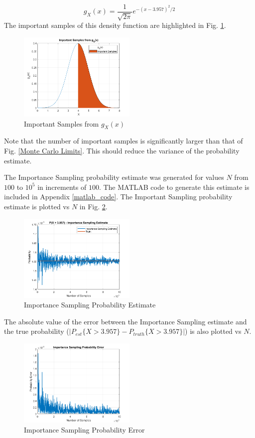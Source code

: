 \documentclass[conference]{IEEEtran}
\begin{document}
\begin{equation}
g_X(x) = \frac{1}{\sqrt{2\pi}}e^{-(x-3.957)^2/2}
\end{equation}
The important samples of this density function are highlighted in Fig. \ref{Important Samples}. 
\begin{figure}[H]
\centerline{\includegraphics[width=0.5\textwidth]{Important_Samples.png}}
\caption{Important Samples from $g_X(x)$}
\label{Important Samples}
\end{figure}
\noindent
Note that the number of important samples is significantly larger than that of Fig. \ref{Monte Carlo Limits}. This should reduce the variance of the probability estimate. 
\par
The Importance Sampling probability estimate was generated for values $N$ from $100$ to $10^5$ in increments of $100$. The MATLAB code to generate this estimate is included in Appendix \ref{matlab_code}. The Important Sampling probability estimate is plotted vs $N$ in Fig. \ref{Importance Sampling Estimate}.
\begin{figure}[H]
\centerline{\includegraphics[width=0.5\textwidth]{Importance_Sampling_Estimate.png}}
\caption{Importance Sampling Probability Estimate}
\label{Importance Sampling Estimate}
\end{figure}
\noindent
The absolute value of the error between the Importance Sampling estimate and the true probability ($|P_{est}\{X > 3.957\} - P_{truth}\{X > 3.957\}|$) is also plotted vs $N$.
\begin{figure}[H]
\centerline{\includegraphics[width=0.5\textwidth]{Importance_Sampling_Error.png}}
\caption{Importance Sampling Probability Error}
\label{Importance Sampling Perr}
\end{figure}
\end{document}
